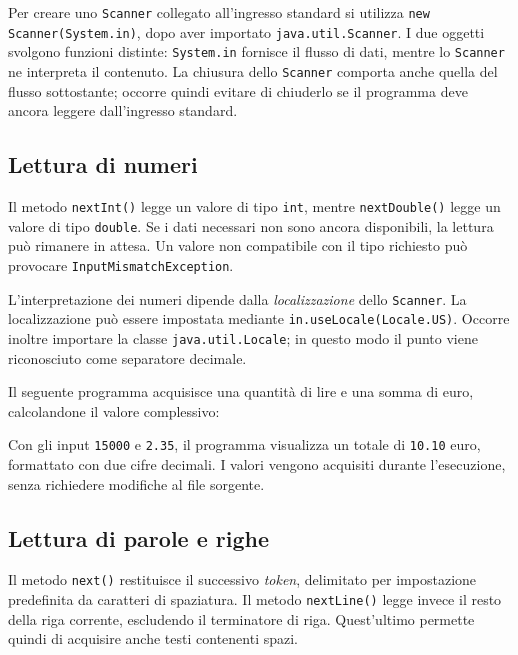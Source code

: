Per creare uno \texttt{Scanner} collegato all'ingresso
standard si utilizza \texttt{new Scanner(System.in)},
dopo aver importato \texttt{java.util.Scanner}.
I due oggetti svolgono funzioni distinte:
\texttt{System.in} fornisce il flusso di dati,
mentre lo \texttt{Scanner} ne interpreta il contenuto.
La chiusura dello \texttt{Scanner} comporta anche
quella del flusso sottostante; occorre quindi evitare
di chiuderlo se il programma deve ancora leggere
dall'ingresso standard.

\subsection{Lettura di numeri}
\label{sec:fi-java-scanner-numeri}

Il metodo \texttt{nextInt()} legge un valore di tipo
\texttt{int}, mentre \texttt{nextDouble()} legge un
valore di tipo \texttt{double}. Se i dati necessari
non sono ancora disponibili, la lettura può rimanere
in attesa. Un valore non compatibile con il tipo
richiesto può provocare \texttt{InputMismatchException}.

L'interpretazione dei numeri dipende dalla
\emph{localizzazione} dello \texttt{Scanner}.
La localizzazione può essere impostata mediante
\texttt{in.useLocale(Locale.US)}. Occorre inoltre importare
la classe \texttt{java.util.Locale}; in questo modo il punto
viene riconosciuto come separatore decimale.

Il seguente programma acquisisce una quantità di lire
e una somma di euro, calcolandone il valore complessivo:



Con gli input \texttt{15000} e \texttt{2.35},
il programma visualizza un totale di \texttt{10.10}
euro, formattato con due cifre decimali.
I valori vengono acquisiti durante l'esecuzione,
senza richiedere modifiche al file sorgente.

\clearpage

\subsection{Lettura di parole e righe}
\label{sec:fi-java-scanner-testo}

Il metodo \texttt{next()} restituisce il successivo
\emph{token}, delimitato per impostazione predefinita
da caratteri di spaziatura. Il metodo
\texttt{nextLine()} legge invece il resto della
riga corrente, escludendo il terminatore di riga.
Quest'ultimo permette quindi di acquisire anche
testi contenenti spazi.


